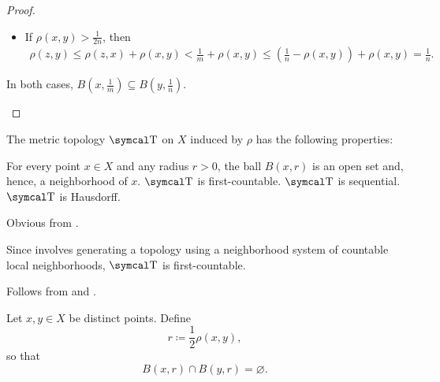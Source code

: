 \begin{proof}
\begin{RefList}
\begin{itemize}
      \item If \( \rho(x, y) > \tfrac 1 {2n} \), then
      \begin{align*}
        \rho(z, y)
        \leq
        \rho(z, x) + \rho(x, y)
        <
        \tfrac 1 m + \rho(x, y)
        \leq
        (\tfrac 1 n - \rho(x, y)) + \rho(x, y)
        =
        \tfrac 1 n.
      \end{align*}
    \end{itemize}

    In both cases, \( B(x, \tfrac 1 m) \subseteq B(y, \tfrac 1 n) \).
  \end{RefList}
\end{proof}

\begin{Proposition}\label{thm:metric_topology_properties}
  The metric topology \( \CT \) on \( X \) induced by \( \rho \) has the following properties:
  \begin{DefEnum}
     For every point \( x \in X \) and any radius \( r > 0 \), the ball \( B(x, r) \) is an open set and, hence, a neighborhood of \( x \).
     \( \CT \) is first-countable.
     \( \CT \) is sequential.
     \( \CT \) is Hausdorff.
  \end{DefEnum}
\end{Proposition}
\begin{RefListProof}
     Obvious from .

     Since  involves generating a topology using a neighborhood system of countable local neighborhoods, \( \CT \) is first-countable.

     Follows from  and .

     Let \( x, y \in X \) be distinct points. Define
    \begin{equation*}
      r \coloneqq \dfrac 1 2 \rho(x, y),
    \end{equation*}
    so that
    \begin{equation*}
      B(x, r) \cap B(y, r) = \varnothing.
    \end{equation*}
\end{RefListProof}

